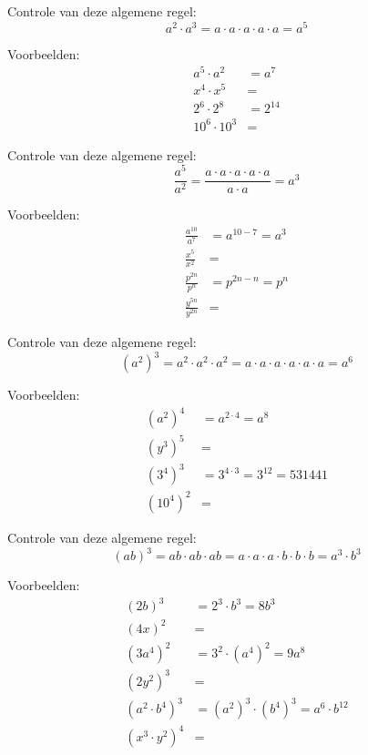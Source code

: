 
Controle van deze algemene regel: 
\[
    a^2\cdot a^3=a\cdot a\cdot a\cdot a\cdot a=a^5
\]

Voorbeelden:
\begin{align*}
a^5 \cdot a^2   &= a^7 \\
x^4 \cdot x^5   &= \\
2^6 \cdot 2^8   &= 2^{14} \\
10^6 \cdot 10^3 &=
\end{align*}


Controle van deze algemene regel: 
\[
    \frac{a^5}{a^2} =\frac{a\cdot a\cdot a\cdot a\cdot a}{a\cdot a}=a^3
\]

Voorbeelden:
\begin{align*}
\frac{a^{10}}{a^7}    &= a^{10-7} = a^3 \\
\frac{x^5}{x^2}       &= \\
\frac{p^{2n}}{p^n}    &= p^{2n-n} = p^n \\
\frac{y^{5n}}{y^{2n}} &=
\end{align*}


Controle van deze algemene regel: 
\[
    (a^2 )^3=a^2\cdot a^2\cdot a^2=a\cdot a\cdot a\cdot a\cdot a\cdot a=a^6
\]

Voorbeelden:
\begin{align*}
(a^2)^4  &= a^{2 \cdot 4} = a^8 \\
(y^3)^5  &= \\
(3^4)^3  &= 3^{4 \cdot 3} = 3^{12} = 531441 \\
(10^4)^2 &=
\end{align*}


Controle van deze algemene regel: 
\[
    (ab)^3=ab\cdot ab\cdot ab=a\cdot a\cdot a\cdot b\cdot b\cdot b=a^3\cdot b^3
\]

Voorbeelden:
\begin{align*}
(2b)^3   &= 2^3 \cdot b^3 = 8b^3 \\
(4x)^2   &= \\
(3a^4)^2 &= 3^2 \cdot (a^4)^2 = 9a^8 \\
(2y^2)^3 &= \\
(a^2 \cdot b^4)^3 &= (a^2)^3 \cdot (b^4)^3 = a^6 \cdot b^{12} \\
(x^3 \cdot y^2)^4 &=
\end{align*}

